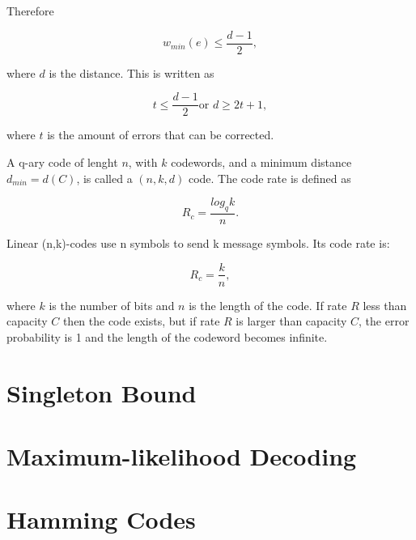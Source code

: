 \documentclass[../main.tex]{subfiles}
\begin{document}
    \noindent
    Therefore

    \begin{equation*}
         w_{min}(e) \leq \frac{d-1}{2},
    \end{equation*}

    \noindent
    where $d$ is the distance. This is written as

    \begin{equation*}
        t \leq \frac{d-1}{2} \text{or } d \geq 2t+1,
    \end{equation*}

    \noindent
    where $t$ is the amount of errors that can be corrected.


    A q-ary code of lenght $n$, with $k$ codewords, and a minimum distance $d_{min}=d(C)$, is called a $(n,k,d)$ code. The code rate is defined as

    \begin{equation*}
        R_c=\frac{log_qk}{n}.
    \end{equation*}

    \noindent
    Linear (n,k)-codes use n symbols to send k message symbols. Its code rate is:

    \begin{equation*}
        R_c=\frac{k}{n},
    \end{equation*}

    \noindent
    where $k$ is the number of bits and $n$ is the length of the code. If rate $R$ less than capacity $C$ then the code exists, but if rate $R$ is larger than capacity $C$, the error probability is 1 and the length of the codeword becomes infinite.


    \section{Singleton Bound}


    \section{Maximum-likelihood Decoding}


    \section{Hamming Codes}
\end{document}
